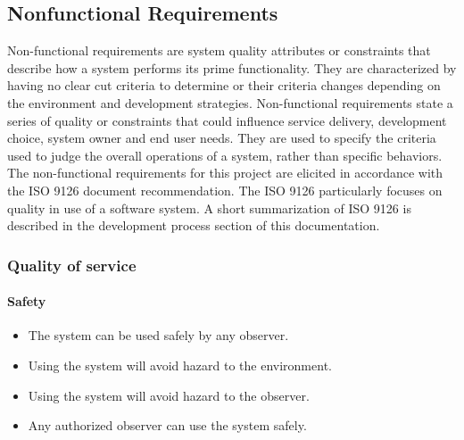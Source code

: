 \newpage
\subsection{Nonfunctional Requirements}
Non-functional requirements are system quality attributes or constraints that describe how a system performs its prime functionality.
They are characterized by having no clear cut criteria to determine or their criteria
changes depending on the environment and development strategies\cite{req:requirements-technique2}.
Non-functional requirements state a series of quality or constraints that could influence service delivery,
development choice, system owner and end user needs.
They are used to specify the criteria used to judge the overall operations of a system,
rather than specific behaviors.
The non-functional requirements for this project are elicited in accordance with the ISO 9126 document recommendation.
The ISO 9126 particularly focuses on quality in use of a software system.
A short summarization of ISO 9126 is described in the development process section of this documentation.
\\[0.4cm]

\subsubsection{Quality of service}
	\paragraph{Safety}

	\begin{itemize}
		\item The system can be used safely by any observer.
        \item Using the system will avoid hazard to the environment.
        \item Using the system will avoid hazard to the observer.
        \item Any authorized observer can use the system safely.
	\end{itemize}
